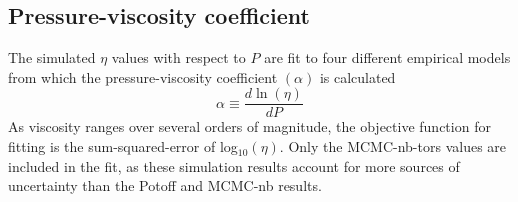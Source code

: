 \documentclass[preprint,review,12pt]{elsarticle}
\begin{document}
	
	\subsection{Pressure-viscosity coefficient} \label{Pressure-viscosity coefficient}
	
    The simulated $\eta$ values with respect to $P$ are fit to four different empirical models from which the pressure-viscosity coefficient $(\alpha)$ is calculated
    \begin{equation}
    \alpha \equiv \frac{d\ln(\eta)}{dP}
    \end{equation}
    As viscosity ranges over several orders of magnitude, the objective function for fitting is the sum-squared-error of log$_{10}(\eta)$. Only the MCMC-nb-tors values are included in the fit, as these simulation results account for more sources of uncertainty than the Potoff and MCMC-nb results. 
    
           
\end{document}
